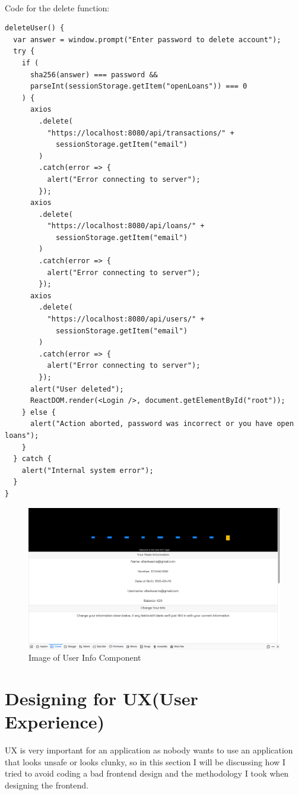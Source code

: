 \\
Code for the delete function:
\begin{verbatim}
deleteUser() {
  var answer = window.prompt("Enter password to delete account");
  try {
    if (
      sha256(answer) === password &&
      parseInt(sessionStorage.getItem("openLoans")) === 0
    ) {
      axios
        .delete(
          "https://localhost:8080/api/transactions/" +
            sessionStorage.getItem("email")
        )
        .catch(error => {
          alert("Error connecting to server");
        });
      axios
        .delete(
          "https://localhost:8080/api/loans/" +
            sessionStorage.getItem("email")
        )
        .catch(error => {
          alert("Error connecting to server");
        });
      axios
        .delete(
          "https://localhost:8080/api/users/" +
            sessionStorage.getItem("email")
        )
        .catch(error => {
          alert("Error connecting to server");
        });
      alert("User deleted");
      ReactDOM.render(<Login />, document.getElementById("root"));
    } else {
      alert("Action aborted, password was incorrect or you have open loans");
    }
  } catch {
    alert("Internal system error");
  }
}
\end{verbatim}
\begin{figure}[H]
\includegraphics[width=\textwidth]{img/userinfocomponent.png}
\caption{Image of User Info Component}
\label{fig:Image of user info component}
\end{figure}
\section{Designing for UX(User Experience)}
UX is very important for an application as nobody wants to use an application that looks unsafe or looks clunky, so in this section I will be discussing how I tried to avoid coding a bad frontend design and the methodology I took when designing the frontend.
